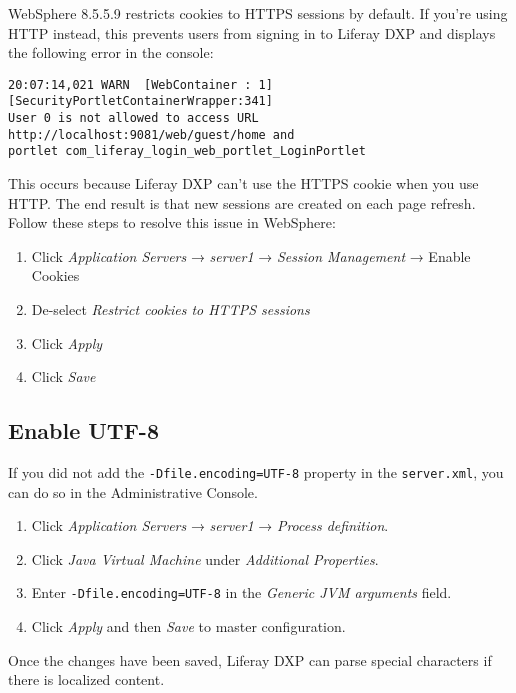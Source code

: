 WebSphere 8.5.5.9 restricts cookies to HTTPS sessions by default. If
you're using HTTP instead, this prevents users from signing in to
Liferay DXP and displays the following error in the console:

\begin{verbatim}
20:07:14,021 WARN  [WebContainer : 1][SecurityPortletContainerWrapper:341]
User 0 is not allowed to access URL http://localhost:9081/web/guest/home and
portlet com_liferay_login_web_portlet_LoginPortlet
\end{verbatim}

This occurs because Liferay DXP can't use the HTTPS cookie when you use
HTTP. The end result is that new sessions are created on each page
refresh. Follow these steps to resolve this issue in WebSphere:

\begin{enumerate}
\def\labelenumi{\arabic{enumi}.}
\item
  Click \emph{Application Servers} → \emph{server1} → \emph{Session
  Management} → Enable Cookies
\item
  De-select \emph{Restrict cookies to HTTPS sessions}
\item
  Click \emph{Apply}
\item
  Click \emph{Save}
\end{enumerate}

\subsection{Enable UTF-8}\label{enable-utf-8}

If you did not add the \texttt{-Dfile.encoding=UTF-8} property in the
\texttt{server.xml}, you can do so in the Administrative Console.

\begin{enumerate}
\def\labelenumi{\arabic{enumi}.}
\item
  Click \emph{Application Servers} → \emph{server1} → \emph{Process
  definition}.
\item
  Click \emph{Java Virtual Machine} under \emph{Additional Properties}.
\item
  Enter \texttt{-Dfile.encoding=UTF-8} in the \emph{Generic JVM
  arguments} field.
\item
  Click \emph{Apply} and then \emph{Save} to master configuration.
\end{enumerate}

Once the changes have been saved, Liferay DXP can parse special
characters if there is localized content.

